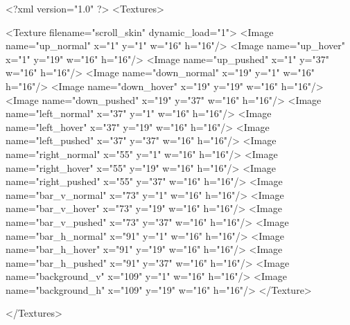 <?xml version="1.0" ?>
<Textures>

	<Texture filename="scroll_skin" dynamic_load="1">
		<Image name="up_normal" x="1" y="1" w="16" h="16"/>
		<Image name="up_hover" x="1" y="19" w="16" h="16"/>
		<Image name="up_pushed" x="1" y="37" w="16" h="16"/>
		<Image name="down_normal" x="19" y="1" w="16" h="16"/>
		<Image name="down_hover" x="19" y="19" w="16" h="16"/>
		<Image name="down_pushed" x="19" y="37" w="16" h="16"/>
		<Image name="left_normal" x="37" y="1" w="16" h="16"/>
		<Image name="left_hover" x="37" y="19" w="16" h="16"/>
		<Image name="left_pushed" x="37" y="37" w="16" h="16"/>
		<Image name="right_normal" x="55" y="1" w="16" h="16"/>
		<Image name="right_hover" x="55" y="19" w="16" h="16"/>
		<Image name="right_pushed" x="55" y="37" w="16" h="16"/>
		<Image name="bar_v_normal" x="73" y="1" w="16" h="16"/>
		<Image name="bar_v_hover" x="73" y="19" w="16" h="16"/>
		<Image name="bar_v_pushed" x="73" y="37" w="16" h="16"/>
		<Image name="bar_h_normal" x="91" y="1" w="16" h="16"/>
		<Image name="bar_h_hover" x="91" y="19" w="16" h="16"/>
		<Image name="bar_h_pushed" x="91" y="37" w="16" h="16"/>
		<Image name="background_v" x="109" y="1" w="16" h="16"/>
		<Image name="background_h" x="109" y="19" w="16" h="16"/>
	</Texture>
	
</Textures>

